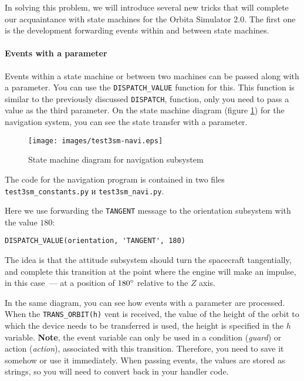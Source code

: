 \documentclass[12pt,a4paper]{article}
\begin{document}
In solving this problem, we will introduce several new tricks that will complete our acquaintance with state machines for the Orbita Simulator 2.0. The first one is the development forwarding events within and between state machines.

\paragraph{Events with a parameter}

Events within a state machine or between two machines can be passed along with a parameter. You can use the \verb'DISPATCH_VALUE' function for this. This function is similar to the previously discussed \verb'DISPATCH', function, only you need to pass a value as the third parameter. On the state machine diagram (figure \ref{Pic:Test3SM-Navi})
for the navigation system, you can see the state transfer with a parameter.

\begin{figure}[tbh]
  \begin{center}
    \texttt{[image: images/test3sm-navi.eps]}
    \caption{State machine diagram for navigation subsystem}
    \label{Pic:Test3SM-Navi}
  \end{center}
\end{figure}

\label{MULTIPLE_MODULES}
The code for the navigation program is contained in two files \verb'test3sm_constants.py' и
\verb'test3sm_navi.py'.

Here we use forwarding the \verb'TANGENT' message to the orientation subsystem with the value
$180$:

\begin{verbatim}
DISPATCH_VALUE(orientation, 'TANGENT', 180)
\end{verbatim}

The idea is that the attitude subsystem should turn the spacecraft tangentially, and complete this transition at the point where the engine will make an impulse, in this case~--- at a position of $180 \degree$ relative to the $Z$ axis.

In the same diagram, you can see how events with a parameter are processed. When the \verb'TRANS_ORBIT(h)' vent is received, the value of the height of the orbit to which the device needs to be transferred is used, the height is specified in the $h$ variable. \textbf{Note},
the event variable can only be used in a condition (\emph{guard}) or action
(\emph{action}), associated with this transition. Therefore, you need to save it somehow or use it immediately. When passing events, the values are stored as strings, so you will need to convert back in your handler code.
\end{document}
